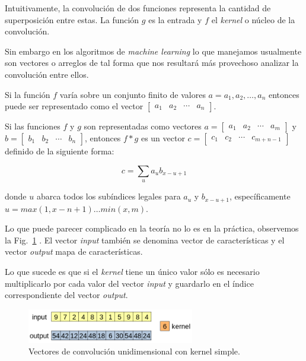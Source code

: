 \documentclass[a4paper,12pt]{article}
\begin{document}
Intuitivamente, la convolución de dos funciones representa la cantidad de superposición entre estas. La función $g$ es la entrada y $f$ el \textit{kernel} o núcleo de la convolución.

Sin embargo en los algoritmos de \textit{machine learning} lo que manejamos usualmente son vectores o arreglos de tal forma que nos resultará más provechoso analizar la convolución entre ellos.

Si la función $f$ varía sobre un conjunto finito de valores $a = a_1, a_2, \dots, a_n$ entonces puede ser representado como el vector 
$\begin{bmatrix} a_1 & a_2 & \cdots & a_n \end{bmatrix}$.

Si las funciones $f$ y $g$ son representadas como vectores $a = \begin{bmatrix} a_1 & a_2 & \cdots & a_m \end{bmatrix}$ y $b = \begin{bmatrix} b_1 & b_2 & \cdots & b_n \end{bmatrix}$, entonces $f*g$ es un vector $c = \begin{bmatrix} c_1 & c_2 & \cdots & c_{m+n-1} \end{bmatrix}$ definido de la siguiente forma:

$$ c = \sum_{u} a_u b_{x-u+1}$$

donde $u$ abarca todos los subíndices legales para $a_u$ y $b_{x-u+1}$, específicamente $u=max(1, x-n+1)\dots min(x,m).$

Lo que puede parecer complicado en la teoría no lo es en la práctica, observemos la Fig.~\ref{fig:conv1dk1} \citep{Cogneethi2019Aug}. El vector \textit{input} también se denomina vector de características y el vector \textit{output} mapa de características.

Lo que sucede es que si el \textit{kernel} tiene un único valor sólo es necesario multiplicarlo por cada valor del vector \textit{input} y guardarlo en el índice correspondiente del vector \textit{output}.

\begin{figure}[H]
	\begin{center}				
	\includegraphics[width=0.65\textwidth]{tesis_24.png}
  	\caption{Vectores de convolución unidimensional con kernel simple.}
  	\label{fig:conv1dk1}
  	\end{center}
\end{figure}
\end{document}
